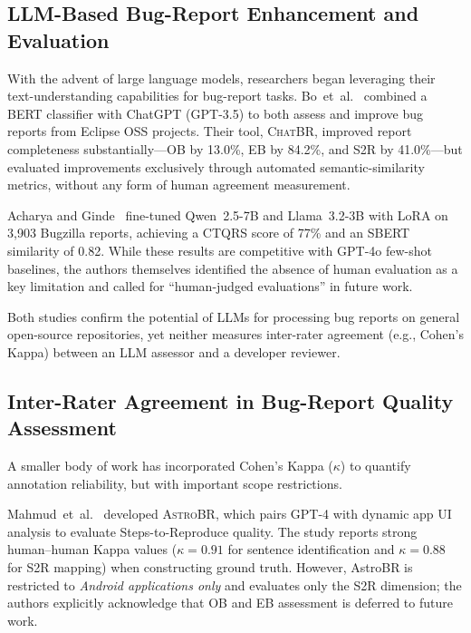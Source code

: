 \subsection{LLM-Based Bug-Report Enhancement and Evaluation}
\label{sec:related:llm}

With the advent of large language models, researchers began
leveraging their text-understanding capabilities for bug-report
tasks.  Bo~et~al.~\cite{bo2024chatbr} combined a BERT classifier
with ChatGPT (GPT-3.5) to both assess and improve bug reports from
Eclipse OSS projects.  Their tool, \textsc{ChatBR}, improved report
completeness substantially---OB by 13.0\%, EB by 84.2\%, and S2R by
41.0\%---but evaluated improvements exclusively through automated
semantic-similarity metrics, without any form of human agreement
measurement.

Acharya and Ginde~\cite{acharya2025enhance} fine-tuned Qwen~2.5-7B
and Llama~3.2-3B with LoRA on 3,903 Bugzilla reports, achieving a
CTQRS score of 77\% and an SBERT similarity of 0.82.  While these
results are competitive with GPT-4o few-shot baselines, the authors
themselves identified the absence of human evaluation as a key
limitation and called for ``human-judged evaluations'' in future
work.

Both studies confirm the potential of LLMs for processing bug
reports on general open-source repositories, yet neither measures
inter-rater agreement (e.g., Cohen's Kappa) between an LLM assessor
and a developer reviewer.

\subsection{Inter-Rater Agreement in Bug-Report Quality Assessment}
\label{sec:related:kappa}

A smaller body of work has incorporated Cohen's Kappa ($\kappa$) to
quantify annotation reliability, but with important scope
restrictions.

Mahmud~et~al.~\cite{mahmud2025astrobr} developed \textsc{AstroBR},
which pairs GPT-4 with dynamic app UI analysis to evaluate
Steps-to-Reproduce quality.  The study reports strong human--human
Kappa values ($\kappa = 0.91$ for sentence identification and
$\kappa = 0.88$ for S2R mapping) when constructing ground truth.
However, AstroBR is restricted to \emph{Android applications only}
and evaluates only the S2R dimension; the authors explicitly
acknowledge that OB and EB assessment is deferred to future work.

